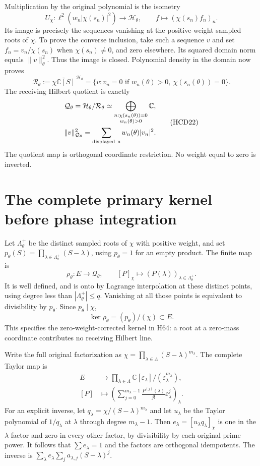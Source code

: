 \documentclass[11pt]{article}
\newcommand{\C}{\mathbb C}
\begin{document}
Multiplication by the original polynomial is the isometry
\[
 U_\chi:\ell^2(w_n|\chi(s_n)|^2)\longrightarrow\mathcal H_\theta,
 \qquad f\longmapsto(\chi(s_n)f_n)_n.
 \tag{HCD20}
\]
Its image is precisely the sequences vanishing at the
positive-weight sampled roots of $\chi$. To prove the
converse inclusion, take such a sequence $v$ and set
$f_n=v_n/\chi(s_n)$ when $\chi(s_n)\ne0$, and zero
elsewhere. Its squared domain norm equals $\|v\|_\theta^2$.
Thus the image is closed. Polynomial density in the domain
now proves
\[
 \mathcal R_\theta:=
 \overline{\chi\C[S]}^{\,\mathcal H_\theta}
 =\{v:v_n=0\text{ if }w_n(\theta)>0,\ \chi(s_n(\theta))=0\}.
 \tag{HCD21}
\]
The receiving Hilbert quotient is exactly
\[
 \begin{gathered}
 \mathcal Q_\theta=\mathcal H_\theta/\mathcal R_\theta
 \simeq
 \bigoplus_{\substack{n:\chi(s_n(\theta))=0\\w_n(\theta)>0}}\C,\\
 \|v\|_{\mathcal Q_\theta}^2
 =\sum_{\rm displayed\ n}w_n(\theta)|v_n|^2.
 \end{gathered}
 \tag{HCD22}
\]
The quotient map is orthogonal coordinate restriction.
No weight equal to zero is inverted.

\section{The complete primary kernel before phase integration}

Let $\Lambda_\theta^+$ be the distinct sampled roots of
$\chi$ with positive weight, and set
$p_\theta(S)=\prod_{\lambda\in\Lambda_\theta^+}(S-\lambda)$,
using $p_\theta=1$ for an empty product.
The finite map is
\[
 \rho_\theta:E\longrightarrow\mathcal Q_\theta,\qquad
 [P]_\chi\longmapsto(P(\lambda))_{\lambda\in\Lambda_\theta^+}.
 \tag{HCD23}
\]
It is well defined, and is onto by Lagrange interpolation
at these distinct points, using degree less than
$|\Lambda_\theta^+|\le q$. Vanishing at all those points
is equivalent to divisibility by $p_\theta$. Since
$p_\theta\mid\chi$,
\[
 \ker\rho_\theta=(p_\theta)/(\chi)\subset E.
 \tag{HCD24}
\]
This specifies the zero-weight-corrected kernel in H64:
a root at a zero-mass coordinate contributes no receiving
Hilbert line.

Write the full original factorization as
$\chi=\prod_{\lambda\in\Lambda}(S-\lambda)^{m_\lambda}$.
The complete Taylor map is
\[
 \begin{split}
 E&\longrightarrow\prod_{\lambda\in\Lambda}
 \C[\varepsilon_\lambda]/(\varepsilon_\lambda^{m_\lambda}),\\
 [P]&\longmapsto\left(
 \sum_{j=0}^{m_\lambda-1}\frac{P^{(j)}(\lambda)}{j!}
 \varepsilon_\lambda^j\right)_\lambda.
 \end{split}
 \tag{HCD25}
\]
For an explicit inverse, let
$q_\lambda=\chi/(S-\lambda)^{m_\lambda}$ and let
$u_\lambda$ be the Taylor polynomial of $1/q_\lambda$
at $\lambda$ through degree $m_\lambda-1$.
Then $e_\lambda=[u_\lambda q_\lambda]_\chi$ is one
in the $\lambda$ factor and zero in every other factor,
by divisibility by each original prime power. It follows
that $\sum e_\lambda=1$ and the factors are orthogonal
idempotents. The inverse is
$\sum_\lambda e_\lambda\sum_j a_{\lambda,j}(S-\lambda)^j$.
\end{document}
